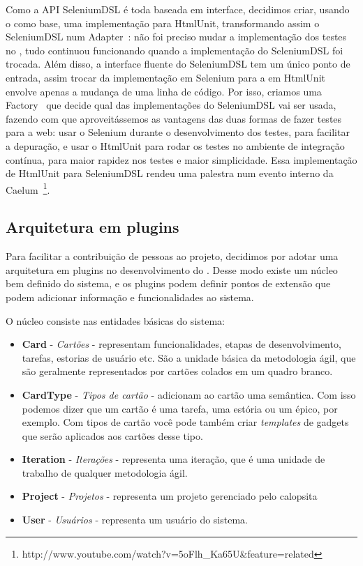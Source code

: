 Como a API SeleniumDSL é toda baseada em interface, decidimos criar, usando o \calopsita como base, uma implementação para
HtmlUnit, transformando assim o SeleniumDSL num Adapter~\cite{gof}: não foi preciso mudar a implementação dos testes no 
\calopsita, tudo continuou funcionando quando a implementação do SeleniumDSL foi trocada. Além disso, a interface fluente
do SeleniumDSL tem um único ponto de entrada, assim trocar da implementação em Selenium para a em HtmlUnit envolve apenas
a mudança de uma linha de código. Por isso, criamos uma Factory~\cite{gof} que decide qual das implementações do SeleniumDSL
vai ser usada, fazendo com que aproveitássemos as vantagens das duas formas de fazer testes para a web: usar o Selenium 
durante o desenvolvimento dos testes, para facilitar a depuração, e usar o HtmlUnit para rodar os testes no ambiente de
integração contínua, para maior rapidez nos testes e maior simplicidade. Essa implementação de HtmlUnit
para SeleniumDSL rendeu uma palestra num evento interno da Caelum~\footnote{http://www.youtube.com/watch?v=5oFlh\_Ka65U\&feature=related}.

\subsection{Arquitetura em plugins}

Para facilitar a contribuição de pessoas ao projeto, decidimos por adotar uma arquitetura em plugins no desenvolvimento
do \calopsita. Desse modo existe um núcleo bem definido do sistema, e os plugins podem definir pontos de extensão que
podem adicionar informação e funcionalidades ao sistema.

O núcleo consiste nas entidades básicas do sistema:

\begin{itemize}
	\item{\textbf{Card} - \textit{Cartões} - representam funcionalidades, etapas de desenvolvimento, tarefas, 
		estorias de usuário etc. 
		São a unidade básica da metodologia ágil, que são geralmente representados por cartões colados em um quadro branco.}
	\item{\textbf{CardType} - \textit{Tipos de cartão} - adicionam ao cartão uma semântica. Com isso podemos dizer que um
		cartão é uma tarefa, uma estória ou um épico, por exemplo. Com tipos de cartão você pode também criar 
		\textit{templates} de gadgets que serão aplicados aos cartões desse tipo.}
	\item{\textbf{Iteration} - \textit{Iterações} - representa uma iteração, que é uma unidade de trabalho de qualquer
		metodologia ágil.}
	\item{\textbf{Project} - \textit{Projetos} - representa um projeto gerenciado pelo calopsita}
	\item{\textbf{User} - \textit{Usuários} - representa um usuário do sistema.}
\end{itemize}

